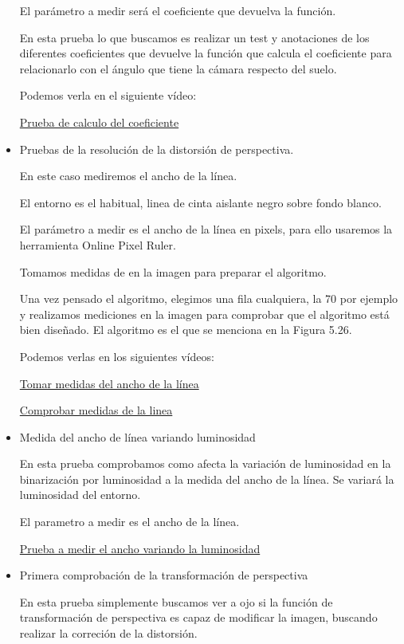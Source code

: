 \begin{itemize}
El parámetro a medir será el coeficiente que devuelva la función.

En esta prueba lo que buscamos es realizar un test y anotaciones de los diferentes coeficientes que devuelve la función que calcula el coeficiente para relacionarlo con el ángulo que tiene la cámara respecto del suelo.
	
	Podemos verla en el siguiente vídeo: 
	
	\href{https://youtu.be/Y9QgFIMXSiU}{Prueba de calculo del coeficiente}
	
	
	\item Pruebas de la resolución de la distorsión de perspectiva. 
	
	En este caso mediremos el ancho de la línea.
	
El entorno es el habitual, linea de cinta aislante negro sobre fondo blanco.

El parámetro a medir es el ancho de la línea en pixels, para ello
usaremos la herramienta Online Pixel Ruler.

Tomamos medidas de en la imagen para preparar el algoritmo.

Una vez pensado el algoritmo, elegimos una fila cualquiera, la 70 por ejemplo y realizamos mediciones en la imagen para comprobar que el algoritmo está bien diseñado. El algoritmo es el que se menciona en la Figura 5.26.

	
	
	
	Podemos verlas en los siguientes vídeos:
	
	\href{https://youtu.be/rUQrHbA_H8A}{Tomar medidas del ancho de la línea}
	
	\href{https://youtu.be/ClA-Ei8f18o}{Comprobar medidas de la linea}
	
	\item Medida del ancho de línea variando luminosidad
	
	En esta prueba comprobamos como afecta la variación de luminosidad en la binarización por luminosidad a la medida del ancho de la línea.
Se variará la luminosidad del entorno.

El parametro a medir es el ancho de la línea.
	
	\href{https://youtu.be/m7t4dcfuFeo}{Prueba a medir el ancho variando la luminosidad}
	
	\item Primera comprobación de la transformación de perspectiva
	
	En esta prueba simplemente buscamos ver a ojo si la función de transformación de perspectiva es capaz de modificar la imagen, buscando realizar la correción de la distorsión.
	

\end{itemize}
